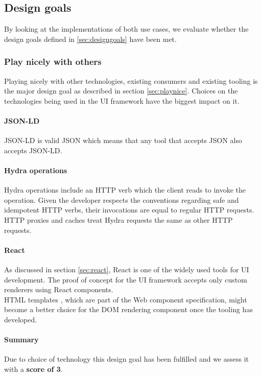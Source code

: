 \subsection{Design goals}
By looking at the implementations of both use cases, we evaluate whether the design goals defined in \ref{sec:designgoals} have been met.

\subsubsection{Play nicely with others}
Playing nicely with other technologies, existing consumers and existing tooling is the major design goal as described in section \ref{sec:playnice}. Choices on the technologies being used in the UI framework have the biggest impact on it.

\paragraph{JSON-LD}
JSON-LD is valid JSON which means that any tool that accepts JSON also accepts JSON-LD.

\paragraph{Hydra operations}
Hydra operations include an  HTTP verb which the client reads to invoke the operation. Given the developer respects the conventions regarding safe and idempotent HTTP verbs, their invocations are equal to regular HTTP requests. HTTP proxies and caches treat Hydra requests the same as other HTTP requests.

\paragraph{React}
As discussed in section \ref{sec:react}, React is one of the widely used tools for UI development. The proof of concept for the UI framework accepts only custom renderers using React components. \\
HTML templates \citep{htmltemplates}, which are part of the Web component specification, might become a better choice for the DOM rendering component once the tooling has developed.

\paragraph{Summary}
Due to choice of technology this design goal has been fulfilled and we assess it with a \textbf{score of 3}.


